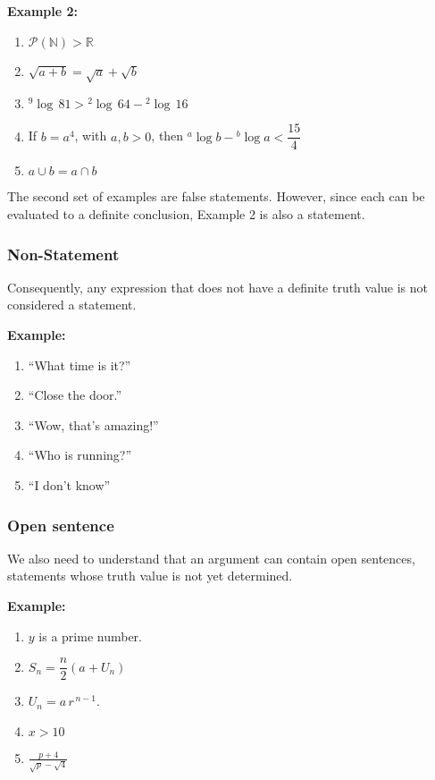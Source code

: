 \documentclass[12pt,a4paper,openany]{article}
\begin{document}
\textbf{Example 2:}

\begin{enumerate}
    \item $ \mathcal{P}(\mathbb{N}) > \mathbb{R} $
    \item $\sqrt{a+b} = \sqrt{a} + \sqrt{b}$
    \item ${}^{9}\!\log\,81 > {}^{2}\!\log\,64 - {}^{2}\!\log\,16$
    \item If $b = a^4$, with $a, b > 0$, then ${}^{a}\!\log b - {}^{b}\!\log a < \dfrac{15}{4}$
    \item $a \cup b = a \cap b$
\end{enumerate}


The second set of examples are false statements. However, since each can be evaluated to a definite conclusion, Example 2 is also a statement.
\newpage

\subsubsection{Non-Statement}

Consequently, any expression that does not have a definite truth value is not considered a statement.

\textbf{Example:}

\begin{enumerate}
    \item ``What time is it?''
    \item ``Close the door.''
    \item ``Wow, that's amazing!''
    \item ``Who is running?''
    \item ``I don't know''
\end{enumerate}


\subsubsection {Open sentence} 

We also need to understand that an argument can contain open sentences, statements whose truth value is not yet determined.  

\textbf{Example:}  

\begin{enumerate}
    \item $y$ is a prime number.
    \item $S_n = \dfrac{n}{2}(a + U_n)$
    \item $U_n = a \, r^{\,n-1}$.
    \item $x > 10$
    \item $\displaystyle \frac{p + 4}{\sqrt{p} - \sqrt{4}}$
\end{enumerate}
\end{document}
